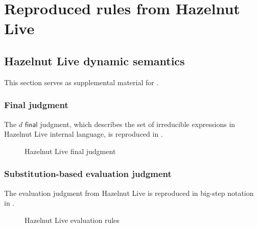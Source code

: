 \chapter{Reproduced rules from Hazelnut Live}
\label{chap:reproduced-hazelnut-live-rules}

\section{Hazelnut Live dynamic semantics}
\label{sec:hazelnut-live-dynamics}

This section serves as supplemental material for .

\subsection{Final judgment}
\label{sec:hazelnut-live-final-judgment}

The $d\textsf{ final}$ judgment, which describes the set of irreducible expressions in Hazelnut Live internal language, is reproduced in .

\begin{figure}
  \centering
  \begin{mdframed}
    \begin{singlespace}
      
    \end{singlespace}
  \end{mdframed}
  \caption{Hazelnut Live \textsf{final} judgment}
  \label{fig:hazelnut-live-final}
\end{figure}

\subsection{Substitution-based evaluation judgment}
\label{sec:hazelnut-live-evaluation}

The evaluation judgment from Hazelnut Live is reproduced in big-step notation in .

\begin{figure}
  \centering
  \begin{mdframed}
    \begin{singlespace}
      
    \end{singlespace}
  \end{mdframed}
  \caption{Hazelnut Live evaluation rules}
  \label{fig:hazelnut-live-evaluation}
\end{figure}

